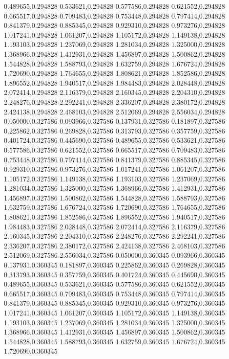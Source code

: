 0.489655,0.294828
0.533621,0.294828
0.577586,0.294828
0.621552,0.294828
0.665517,0.294828
0.709483,0.294828
0.753448,0.294828
0.797414,0.294828
0.841379,0.294828
0.885345,0.294828
0.929310,0.294828
0.973276,0.294828
1.017241,0.294828
1.061207,0.294828
1.105172,0.294828
1.149138,0.294828
1.193103,0.294828
1.237069,0.294828
1.281034,0.294828
1.325000,0.294828
1.368966,0.294828
1.412931,0.294828
1.456897,0.294828
1.500862,0.294828
1.544828,0.294828
1.588793,0.294828
1.632759,0.294828
1.676724,0.294828
1.720690,0.294828
1.764655,0.294828
1.808621,0.294828
1.852586,0.294828
1.896552,0.294828
1.940517,0.294828
1.984483,0.294828
2.028448,0.294828
2.072414,0.294828
2.116379,0.294828
2.160345,0.294828
2.204310,0.294828
2.248276,0.294828
2.292241,0.294828
2.336207,0.294828
2.380172,0.294828
2.424138,0.294828
2.468103,0.294828
2.512069,0.294828
2.556034,0.294828
0.050000,0.327586
0.093966,0.327586
0.137931,0.327586
0.181897,0.327586
0.225862,0.327586
0.269828,0.327586
0.313793,0.327586
0.357759,0.327586
0.401724,0.327586
0.445690,0.327586
0.489655,0.327586
0.533621,0.327586
0.577586,0.327586
0.621552,0.327586
0.665517,0.327586
0.709483,0.327586
0.753448,0.327586
0.797414,0.327586
0.841379,0.327586
0.885345,0.327586
0.929310,0.327586
0.973276,0.327586
1.017241,0.327586
1.061207,0.327586
1.105172,0.327586
1.149138,0.327586
1.193103,0.327586
1.237069,0.327586
1.281034,0.327586
1.325000,0.327586
1.368966,0.327586
1.412931,0.327586
1.456897,0.327586
1.500862,0.327586
1.544828,0.327586
1.588793,0.327586
1.632759,0.327586
1.676724,0.327586
1.720690,0.327586
1.764655,0.327586
1.808621,0.327586
1.852586,0.327586
1.896552,0.327586
1.940517,0.327586
1.984483,0.327586
2.028448,0.327586
2.072414,0.327586
2.116379,0.327586
2.160345,0.327586
2.204310,0.327586
2.248276,0.327586
2.292241,0.327586
2.336207,0.327586
2.380172,0.327586
2.424138,0.327586
2.468103,0.327586
2.512069,0.327586
2.556034,0.327586
0.050000,0.360345
0.093966,0.360345
0.137931,0.360345
0.181897,0.360345
0.225862,0.360345
0.269828,0.360345
0.313793,0.360345
0.357759,0.360345
0.401724,0.360345
0.445690,0.360345
0.489655,0.360345
0.533621,0.360345
0.577586,0.360345
0.621552,0.360345
0.665517,0.360345
0.709483,0.360345
0.753448,0.360345
0.797414,0.360345
0.841379,0.360345
0.885345,0.360345
0.929310,0.360345
0.973276,0.360345
1.017241,0.360345
1.061207,0.360345
1.105172,0.360345
1.149138,0.360345
1.193103,0.360345
1.237069,0.360345
1.281034,0.360345
1.325000,0.360345
1.368966,0.360345
1.412931,0.360345
1.456897,0.360345
1.500862,0.360345
1.544828,0.360345
1.588793,0.360345
1.632759,0.360345
1.676724,0.360345
1.720690,0.360345
